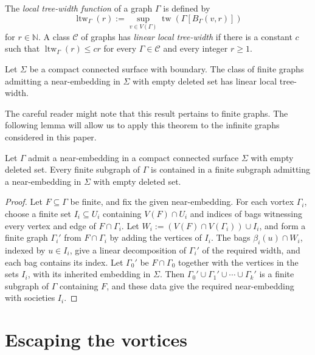 \documentclass[a4paper]{amsart}
\begin{document}
\begin{definition}\label{def:local-tree-width}
The \emph{local tree-width function} of a graph $\Gamma$ is defined by 
$$
\operatorname{ltw}_\Gamma(r):=\sup_{v\in V(\Gamma)}\operatorname{tw}(\Gamma[B_\Gamma(v,r)])
$$
for $r\in\mathbb{N}$.
A class $\mathcal{C}$ of graphs has \emph{linear local tree-width} if there is a constant $c$ such that $\operatorname{ltw}_\Gamma(r)\leq cr$ for every $\Gamma\in\mathcal{C}$ and every integer $r\geq1$.
\end{definition}

\begin{theorem}\label{thm:grohe-local-tree-width}
Let $\Sigma$ be a compact connected surface with boundary.
The class of finite graphs admitting a near-embedding in $\Sigma$ with empty deleted set has linear local tree-width.
\end{theorem}

The careful reader might note that this result pertains to finite graphs.
The following lemma will allow us to apply this theorem to the infinite graphs considered in this paper.

\begin{lemma}\label{lem:finite-near-embedded-subgraph}
Let $\Gamma$ admit a near-embedding in a compact connected surface $\Sigma$ with empty deleted set.
Every finite subgraph of $\Gamma$ is contained in a finite subgraph admitting a near-embedding in $\Sigma$ with empty deleted set.
\end{lemma}

\begin{proof}
Let $F\subseteq\Gamma$ be finite, and fix the given near-embedding.
For each vortex $\Gamma_i$, choose a finite set $I_i\subseteq U_i$ containing $V(F)\cap U_i$ and indices of bags witnessing every vertex and edge of $F\cap\Gamma_i$.
Let $W_i:=(V(F)\cap V(\Gamma_i))\cup I_i$, and form a finite graph $\Gamma_i'$ from $F\cap\Gamma_i$ by adding the vertices of $I_i$.
The bags $\beta_i(u)\cap W_i$, indexed by $u\in I_i$, give a linear decomposition of $\Gamma_i'$ of the required width, and each bag contains its index.
Let $\Gamma_0'$ be $F\cap\Gamma_0$ together with the vertices in the sets $I_i$, with its inherited embedding in $\Sigma$.
Then $\Gamma_0'\cup\Gamma_1'\cup\cdots\cup\Gamma_k'$ is a finite subgraph of $\Gamma$ containing $F$, and these data give the required near-embedding with societies $I_i$.
\end{proof}

\section{Escaping the vortices}\label{sec:escaping-vortex}
\end{document}
